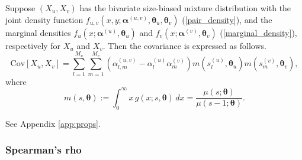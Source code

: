 \documentclass[eng]{csam}
\def\a{\alpha}
\def\mC{\text{Cov}}
\begin{document}
\begin{proposition}\label{prop:cov}
Suppose $(X_u, X_v)$ has the bivariate size-biased mixture distribution with the joint density function $f_{u,v}(x, y; \bm{\a}^{(u,v)}, \bm{\theta}_u, \bm{\theta}_v)$ (\ref{pair_density}), and the marginal densities $f_u(x; \bm{\a}^{(u)}, \bm{\theta}_u)$ and $f_v(x; \bm{\a}^{(v)}, \bm{\theta}_v)$ (\ref{marginal_density}), respectively for $X_u$ and $X_v$. Then the covariance is expressed as follows.
\begin{equation}
\mC[X_u, X_v] = \sum_{l = 1}^{M_u}\sum_{m = 1}^{M_v} \left(\a^{(u,v)}_{l,m} - \a^{(u)}_{l} \a^{(v)}_{m}\right)m(s_l^{(u)},\bm{\theta}_u)m(s_m^{(v)},\bm{\theta}_v),
\end{equation}
where
\begin{equation*}
m(s,\bm{\theta}) := \int_0^\infty x\, g(x;s,\bm{\theta})\,dx = \frac{\mu(s;\bm{\theta})}{\mu(s-1;\bm{\theta})}.
\end{equation*}
\end{proposition}

 See Appendix \ref{app:props}.

\subsubsection{Spearman's rho}
\end{document}

